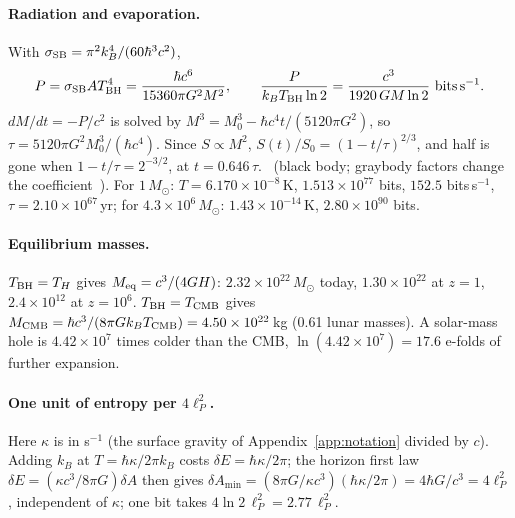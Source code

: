 \paragraph{Radiation and evaporation.} With $\sigma_{\rm SB}=\pi^2k_B^4/(60\hbar^3c^2)$,
\[ P=\sigma_{\rm SB}AT_{\rm BH}^4=\frac{\hbar c^6}{15360\pi G^2M^2},\qquad \frac{P}{k_BT_{\rm BH}\ln2}=\frac{c^3}{1920\,GM\ln2}\ {\rm bits\,s^{-1}}. \] $dM/dt=-P/c^2$ is solved by $M^3=M_0^3-\hbar c^4t/(5120\pi G^2)$, so
$\tau=5120\pi G^2M_0^3/(\hbar c^4)$. Since $S\propto M^2$, $S(t)/S_0=(1-t/\tau)^{2/3}$, and half is gone when $1-t/\tau=2^{-3/2}$, at $t=0.646\,\tau$.
\derived\ (black body; graybody factors change the coefficient~\cite{Page1976}). For $1\,M_\odot$: $T=6.170\times10^{-8}$\,K, $1.513\times10^{77}$ bits,
$152.5$ bits\,s$^{-1}$, $\tau=2.10\times10^{67}$\,yr; for $4.3\times10^6\,M_\odot$: $1.43\times10^{-14}$\,K, $2.80\times10^{90}$ bits. \calc

\paragraph{Equilibrium masses.} $T_{\rm BH}=T_H$ gives $M_{\rm eq}=c^3/(4GH)$: $2.32\times10^{22}\,M_\odot$ today, $1.30\times10^{22}$ at $z=1$,
$2.4\times10^{12}$ at $z=10^6$. $T_{\rm BH}=T_{\rm CMB}$ gives $M_{\rm CMB}=\hbar c^3/(8\pi Gk_BT_{\rm CMB})=4.50\times10^{22}$\,kg (0.61 lunar masses).
A solar-mass hole is $4.42\times10^7$ times colder than the CMB, $\ln(4.42\times10^7)=17.6$ e-folds of further expansion. \calc

\paragraph{One unit of entropy per $4\ell_P^2$.} Here $\kappa$ is in s$^{-1}$ (the surface gravity of Appendix~\ref{app:notation} divided by $c$). Adding $k_B$ at $T=\hbar\kappa/2\pi k_B$ costs $\delta E=\hbar\kappa/2\pi$; the horizon first law
$\delta E=(\kappa c^3/8\pi G)\delta A$ then gives $\delta A_{\min}=(8\pi G/\kappa c^3)(\hbar\kappa/2\pi)=4\hbar G/c^3=4\ell_P^2$, independent of $\kappa$;
one bit takes $4\ln2\,\ell_P^2=2.77\,\ell_P^2$. \derived

